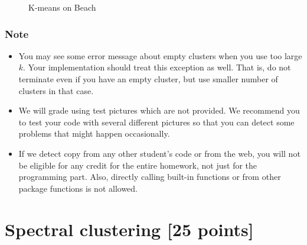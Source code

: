 \documentclass[twoside,10pt]{article}
\begin{document}
\begin{enumerate}
\begin{itemize}
\begin{figure}
\caption{K-means on Beach}
\label{fig:fig}
\end{figure}  
  
  
  
  \end{itemize}
\end{enumerate}


\subsubsection*{Note}
\begin{itemize}
  \item You may see some error message about empty clusters when you use too large $k$. Your implementation should treat this exception as well. That is, do not terminate even if you have an empty cluster, but use smaller number of clusters in that case.

  \item We will grade using test pictures which are not provided. We recommend you to test your code with several different pictures so that you can detect some problems that might happen occasionally. 

  \item If we detect copy from any other student's code or from the web, you will not be eligible for any credit for the entire homework, not just for the programming part. Also, directly calling built-in functions or from other package functions is not allowed.
\end{itemize}


\section{Spectral clustering [25 points]}
\end{document}
